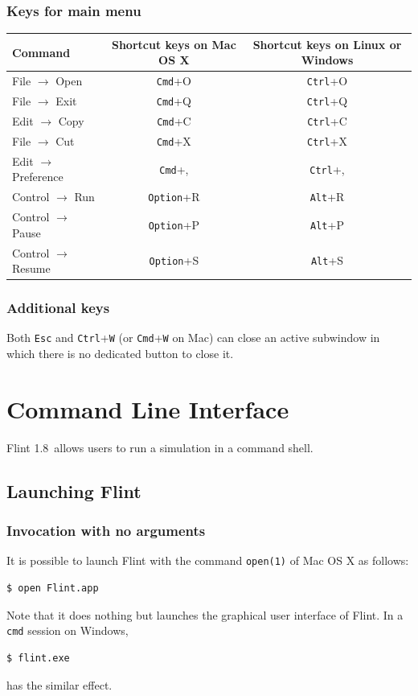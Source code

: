 \documentclass[a4paper,10pt]{report}
\def\FlintVersion{1.8}
\def\Flint{Flint \FlintVersion}
\begin{document}
\subsection{Keys for main menu}
\begin{tabular}{l||c|c}
  Command & Shortcut keys on Mac OS X & Shortcut keys on Linux or Windows\\
  \hline
  File $\rightarrow$ Open & {\tt Cmd}+O & {\tt Ctrl}+O \\
  File $\rightarrow$ Exit & {\tt Cmd}+Q & {\tt Ctrl}+Q \\
  Edit $\rightarrow$ Copy & {\tt Cmd}+C & {\tt Ctrl}+C \\
  File $\rightarrow$ Cut  & {\tt Cmd}+X & {\tt Ctrl}+X \\
  Edit $\rightarrow$ Preference & {\tt Cmd}+, & {\tt Ctrl}+, \\
  Control $\rightarrow$ Run & {\tt Option}+R & {\tt Alt}+R \\
  Control $\rightarrow$ Pause & {\tt Option}+P & {\tt Alt}+P \\
  Control $\rightarrow$ Resume & {\tt Option}+S & {\tt Alt}+S \\
\end{tabular}

\subsection{Additional keys}
Both {\tt Esc} and {\tt Ctrl}+{\tt W} (or {\tt Cmd}+{\tt W} on Mac) can close an active
subwindow in which there is no dedicated button to close it.


\chapter{Command Line Interface}
\Flint\ allows users to run a simulation in a command shell.

\section{Launching Flint}

\subsection{Invocation with no arguments}
It is possible to launch Flint with the command {\tt open(1)} of Mac OS X as follows:
\begin{verbatim}
$ open Flint.app
\end{verbatim}
Note that it does nothing but launches the graphical user interface of Flint.
In a {\tt cmd} session on Windows,
\begin{verbatim}
$ flint.exe
\end{verbatim}
has the similar effect.
\end{document}
